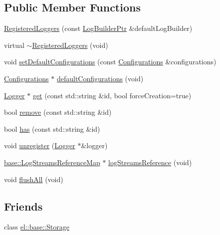 \subsection*{Public Member Functions}
\begin{DoxyCompactItemize}
\item 
\hyperlink{classel_1_1base_1_1_registered_loggers_ae52ec336770d33fef86f234e4e68dce5}{Registered\+Loggers} (const \hyperlink{namespaceel_ad4c4b2f7d70a4b02568a9f70724a6b39}{Log\+Builder\+Ptr} \&default\+Log\+Builder)
\item 
virtual \hyperlink{classel_1_1base_1_1_registered_loggers_ac87ee24f4d1bb36757f6ce1e1f5a8362}{$\sim$\+Registered\+Loggers} (void)
\item 
void \hyperlink{classel_1_1base_1_1_registered_loggers_a28e1f955ad55d89a4ae91fa74545ee4f}{set\+Default\+Configurations} (const \hyperlink{classel_1_1_configurations}{Configurations} \&configurations)
\item 
\hyperlink{classel_1_1_configurations}{Configurations} $\ast$ \hyperlink{classel_1_1base_1_1_registered_loggers_acb38f67cf5e297f4be3efa5312e09914}{default\+Configurations} (void)
\item 
\hyperlink{classel_1_1_logger}{Logger} $\ast$ \hyperlink{classel_1_1base_1_1_registered_loggers_a8e554505cd7f66d31e91933b61d74144}{get} (const std\+::string \&id, bool force\+Creation=true)
\item 
bool \hyperlink{classel_1_1base_1_1_registered_loggers_a4d17dc9673f6aa6216571e182097400a}{remove} (const std\+::string \&id)
\item 
bool \hyperlink{classel_1_1base_1_1_registered_loggers_a85916925e2c53d1ebf9865625132a0be}{has} (const std\+::string \&id)
\item 
void \hyperlink{classel_1_1base_1_1_registered_loggers_ad8fa8f829fdb6a03e6f5a38704811e7b}{unregister} (\hyperlink{classel_1_1_logger}{Logger} $\ast$\&logger)
\item 
\hyperlink{namespaceel_1_1base_af7602da9fe1d6c75985184fb0e39fd11}{base\+::\+Log\+Streams\+Reference\+Map} $\ast$ \hyperlink{classel_1_1base_1_1_registered_loggers_a11eb24bac74b7ae2d85b324fed707819}{log\+Streams\+Reference} (void)
\item 
void \hyperlink{classel_1_1base_1_1_registered_loggers_abe6fdac67d9d4c35fb48c9fd88a49c2e}{flush\+All} (void)
\end{DoxyCompactItemize}
\subsection*{Friends}
\begin{DoxyCompactItemize}
\item 
class \hyperlink{classel_1_1base_1_1_registered_loggers_acc1efd1b8a3fc5e0028dab98b02e550a}{el\+::base\+::\+Storage}
\end{DoxyCompactItemize}
